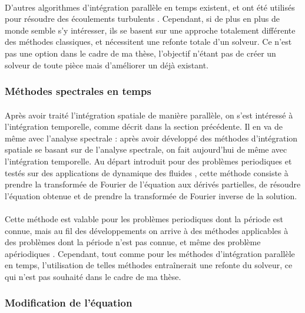       \paragraph{}
      D'autres algorithmes d'intégration parallèle en temps existent, et ont été utilisés pour résoudre des écoulements turbulents \cite{Lunet2018}.
      Cependant, si de plus en plus de monde semble s'y intéresser, ils se basent sur une approche totalement différente des méthodes classiques, et nécessitent une refonte totale d'un solveur.
      Ce n'est pas une option dans le cadre de ma thèse, l'objectif n'étant pas de créer un solveur de toute pièce mais d'améliorer un déjà existant.


    \subsubsection{Méthodes spectrales en temps}

      \paragraph{}
      Après avoir traité l'intégration spatiale de manière parallèle, on s'est intéressé à l'intégration temporelle, comme décrit dans la section précédente.
      Il en va de même avec l'analyse spectrale : après avoir développé des méthodes d'intégration spatiale se basant sur de l'analyse spectrale, on fait aujourd'hui de même avec l'intégration temporelle.
      Au départ introduit pour des problèmes periodiques et testés sur des applications de dynamique des fluides \cite{GopinathJameson2005, GopinathJameson2006}, cette méthode consiste à prendre la transformée de Fourier de l'équation aux dérivés partielles, de résoudre l'équation obtenue et de prendre la transformée de Fourier inverse de la solution.

      \paragraph{}
      Cette méthode est valable pour les problèmes periodiques dont la période est connue, mais au fil des développements on arrive à des méthodes applicables à des problèmes dont la période n'est pas connue, et même des problème apériodiques \cite{EkiciDjeddiLiEtAl2020}.
      Cependant, tout comme pour les méthodes d'intégration parallèle en temps, l'utilisation de telles méthodes entraînerait une refonte du solveur, ce qui n'est pas souhaité dans le cadre de ma thèse.


    \subsubsection{Modification de l'équation}

